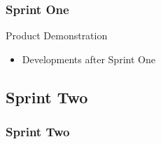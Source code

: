 \begin{frame}
\frametitle{Sprint One}
\begin{center}
Product Demonstration
\begin{itemize}
\item Developments after Sprint One
\end{itemize}
\end{center}

\end{frame}

\subsection{Sprint Two}
\begin{frame}
\frametitle{Sprint Two}
\centering
{}
\end{frame}

